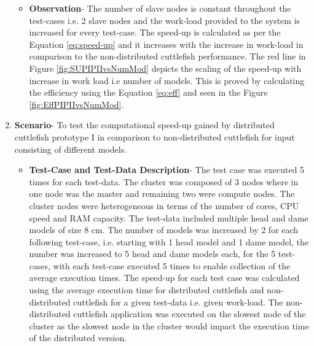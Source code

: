 \begin{enumerate}
\begin{itemize}
\item{\textbf{Observation}}- The number of slave nodes is constant throughout the test-cases i.e. 2 slave nodes and the work-load provided to the system is increased for every test-case. The speed-up is calculated as per the Equation \ref{eq:speed-up} and it increases with the increase in work-load in comparison to the non-distributed cuttlefish performance. The red line in Figure \ref{fig:SUPIPIIvsNumMod} depicts the scaling of the speed-up with increase in work load i.e number of models. This is proved by calculating the efficiency using the Equation \ref{eq:eff} and seen in the Figure \ref{fig:EffPIPIIvsNumMod}. 
\end{itemize}

\item{\textbf{Scenario}}- To test the computational speed-up gained by distributed cuttlefish prototype I in comparison to non-distributed cuttlefish for input consisting of different models.
\begin{itemize}
\item{\textbf{Test-Case and Test-Data Description}}- The test case was executed 5 times for each test-data. The cluster was composed of 3 nodes where in one node was the master and remaining two were compute nodes. The cluster nodes were heterogeneous in terms of the number of cores, CPU speed and RAM capacity. The test-data included multiple head and dame models of size 8 cm. The number of models was increased by 2 for each following test-case, i.e. starting with 1 head model and 1 dame model, the number was increased to 5 head and dame models each, for the 5 test-cases, with each test-case executed 5 times to enable collection of the average execution times. The speed-up for each test case was calculated using the average execution time for distributed cuttlefish and non-distributed cuttlefish for a given test-data i.e. given work-load. The non-distributed cuttlefish application was executed on the slowest node of the cluster as the slowest node in the cluster would impact the execution time of the distributed version. 

\end{itemize}
\end{enumerate}
